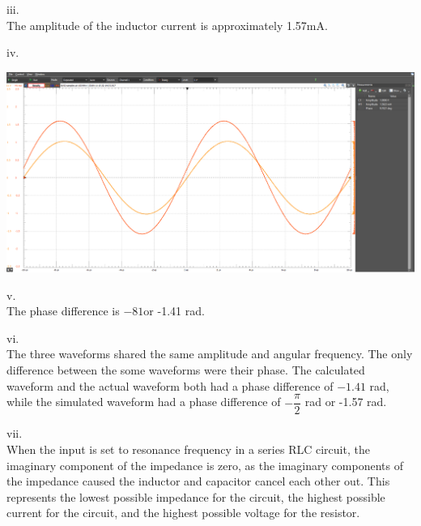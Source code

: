 \documentclass[12pt]{article}
\begin{document}
iii. \\
The amplitude of the inductor current is approximately 1.57mA.

iv. 
\begin{center}
    \includegraphics[width=\textwidth]{q4.png}
\end{center}
v. \\
The phase difference is $-81$\degree or -1.41 rad.

vi. \\
The three waveforms shared the same amplitude and angular frequency. The only difference between the some waveforms were their phase. The calculated waveform and the actual waveform both had a phase difference of $-1.41$ rad, while the simulated waveform had a phase difference of $-\dfrac{\pi}{2}$ rad or -1.57 rad.

vii.\\
When the input is set to resonance frequency in a series RLC circuit, the imaginary component of the impedance is zero, as the imaginary components of the impedance caused the inductor and capacitor cancel each other out. This represents the lowest possible impedance for the circuit, the highest possible current for the circuit, and the highest possible voltage for the resistor.
\end{document}
